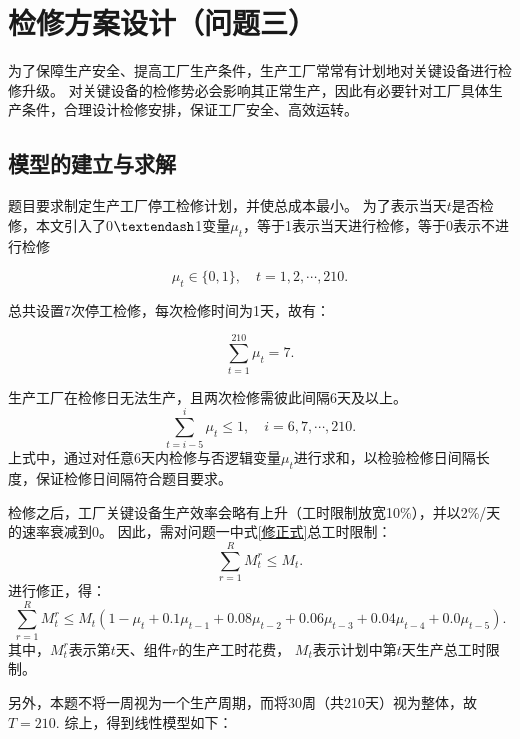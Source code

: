 \section{检修方案设计（问题三）} %
\label{sec:检修方案设计}

为了保障生产安全、提高工厂生产条件，生产工厂常常有计划地对关键设备进行检修升级。
对关键设备的检修势必会影响其正常生产，因此有必要针对工厂具体生产条件，合理设计检修安排，保证工厂安全、高效运转。

\subsection{模型的建立与求解} %
\label{sub:模型的建立与求解}

题目要求制定生产工厂停工检修计划，并使总成本最小。
为了表示当天$t$是否检修，本文引入了0$\textendash$1变量$\mu_t$，等于1表示当天进行检修，等于0表示不进行检修

\begin{equation}
	\mu_{t} \in\{0,1\},\quad t=1,2,\cdots,210.
\end{equation}

总共设置7次停工检修，每次检修时间为1天，故有：

\begin{equation}
	\sum_{t=1}^{210}\mu_t=7.
\end{equation}

生产工厂在检修日无法生产，且两次检修需彼此间隔6天及以上。
\begin{equation}
	\sum_{t=i-5}^{i} \mu_{t} \leqslant 1,\quad i=6,7, \cdots, 210.
\end{equation}
上式中，通过对任意6天内检修与否逻辑变量$\mu_t$进行求和，以检验检修日间隔长度，保证检修日间隔符合题目要求。

检修之后，工厂关键设备生产效率会略有上升（工时限制放宽10\%），并以2\%/天的速率衰减到0。
因此，需对问题一中式\ref{修正式}总工时限制：
\begin{equation}
	\sum_{r=1}^{R} M_{t}^{r} \leqslant M_{t}.
\end{equation}
进行修正，得：
\begin{equation}
	\sum_{r=1}^{R} M_{t}^{r} \leqslant M_{t}\left(1-\mu_{t}+0.1 \mu_{t-1}+0.08 \mu_{t-2}+0.06 \mu_{t-3}+0.04 \mu_{t-4}+0.0 \mu_{t-5}\right).
\end{equation}
其中，$M_{t}^{r}$表示第$t$天、组件$r$的生产工时花费，
$M_{t}$表示计划中第$t$天生产总工时限制。

另外，本题不将一周视为一个生产周期，而将30周（共210天）视为整体，故$T=210$.
\newpage
综上，得到线性模型如下：

